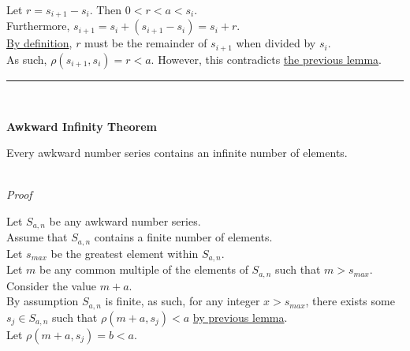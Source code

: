 \documentclass[a4paper,12pt]{article}
\begin{document}
\noindent Let $r = s_{i + 1} - s_i$. Then $0 < r < a < s_i$.\\

\noindent Furthermore, $s_{i + 1} = s_i + (s_{i + 1} - s_i) = s_i + r$.\\

\noindent \hyperlink{theorem:remainder_theorem}{By definition}, $r$ must be the remainder of $s_{i + 1}$ when divided by $s_i$.\\

\noindent As such, $\rho(s_{i + 1}, s_i) = r < a$. However, this contradicts \hyperlink{lemma:non_divisibility_of_elements}{the previous lemma}.

\begin{center}
\noindent\rule{8cm}{0.4pt}
\end{center}
\noindent \\






\label{theorem:infinite_asn}
\hypertarget{theorem:infinite_asn}{}
\begin{tcolorbox}
\textbf{Awkward Infinity Theorem}

Every awkward number series contains an infinite number of elements.
\end{tcolorbox}

\noindent \\
\textit{Proof}

\noindent Let $S_{a,n}$ be any awkward number series.\\

\noindent Assume that $S_{a,n}$ contains a finite number of elements.\\

\noindent Let $s_{max}$ be the greatest element within $S_{a, n}$.\\

\noindent Let $m$ be any common multiple of the elements of $S_{a, n}$ such that $m > s_{max}$.\\

\noindent Consider the value $m + a$.\\

\noindent By assumption $S_{a, n}$ is finite, as such, for any integer $x > s_{max}$, there exists some $s_j \in S_{a,n}$ such that $\rho(m + a, s_j) < a$ \hyperlink{lemma:exists_element_less_than_x}{by previous lemma}.\\

\noindent Let $\rho(m + a, s_j) = b < a$.\\
\end{document}
